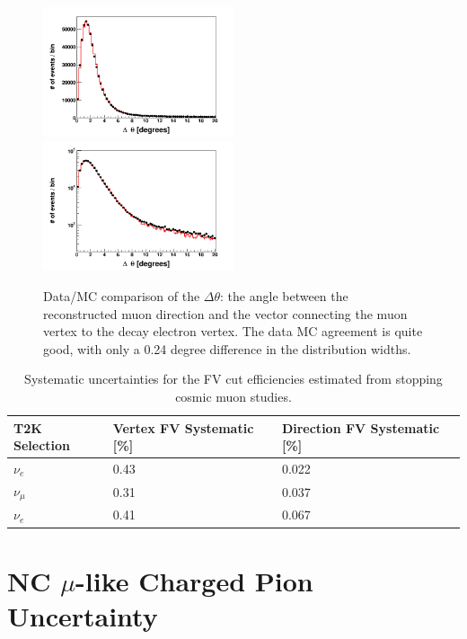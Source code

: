 \documentclass[12pt]{article}
\begin{document}
\begin{figure}[h]
  \begin{center}
    \includegraphics[width=0.5\textwidth]{cosmic_dtheta}
    \includegraphics[width=0.5\textwidth]{cosmic_dtheta_log}
  \end{center}
  \caption{Data/MC comparison of the $\Delta \theta$: the angle between the
  reconstructed muon direction and the vector connecting the muon vertex to the
  decay electron vertex.  The data MC agreement is quite good, with only a 0.24
  degree difference in the distribution widths.}
  \label{fig:dirres}
\end{figure}

\begin{table}
  \centering
  \begin{tabular}{l | l | l}
    \hline\hline
    T2K Selection & Vertex FV Systematic [\%] & Direction FV Systematic [\%] \\
    \hline
    $\nu_{e}$ & 0.43 & 0.022\\
    $\nu_{\mu}$ & 0.31 & 0.037 \\
    $\nu_{e}$ & 0.41 & 0.067 \\
    \hline
  \end{tabular}
  \caption{Systematic uncertainties for the FV cut efficiencies estimated from
  stopping cosmic muon studies.}
  \label{tab:fverr}
\end{table}

\FloatBarrier

\section{NC $\mu$-like Charged Pion Uncertainty}
\end{document}
